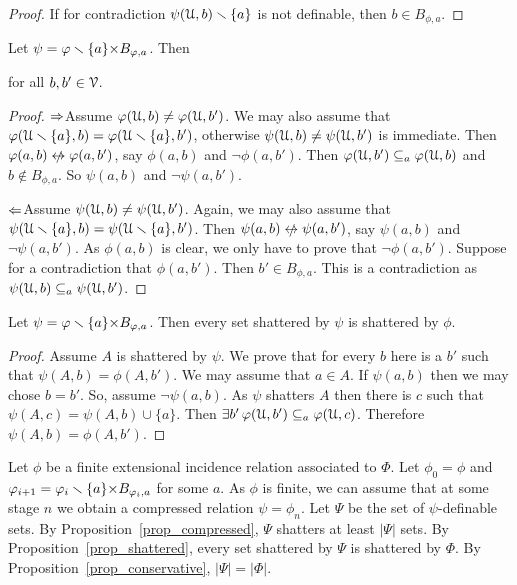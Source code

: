 \documentclass[sputnik.tex]{subfiles}
\begin{document}
\begin{proof}
If for contradiction $\psi(\EuScript U,b)\smallsetminus\{a\}$ is not definable, then $b\in B_{\phi,a}$.
\end{proof}


\begin{proposition}\label{prop_conservative} Let $\psi=\varphi\smallsetminus\{a\}{\times}B_{\varphi,a}$.
Then

\hfill for all $b,b'\in\EuScript V$.
\end{proposition}

\begin{proof}
$\Rightarrow$\quad Assume $\varphi(\EuScript U,b)\neq\varphi(\EuScript U,b')$.
We may also assume that $\varphi(\EuScript U\smallsetminus\{a\},b)=\varphi(\EuScript U\smallsetminus\{a\},b')$, otherwise $\psi(\EuScript U,b)\neq\psi(\EuScript U,b')$ is immediate.
Then $\phi(a,b)\niff\phi(a,b')$, say $ \phi(a,b)$ and $\neg \phi(a,b')$.
Then $\varphi(\EuScript U,b')\subseteq_a\varphi(\EuScript U,b)$ and $b\notin B_{\phi,a}$.
So $\psi(a,b)$ and $\neg \psi(a,b')$.

$\Leftarrow$\quad Assume $\psi(\EuScript U,b)\neq\psi(\EuScript U,b')$. 
Again, we may also assume that $\psi(\EuScript U\smallsetminus\{a\},b)=\psi(\EuScript U\smallsetminus\{a\},b')$.
Then $\psi(a,b)\niff\psi(a,b')$, say $\psi(a,b)$ and $\neg\psi(a,b')$.
As $\phi(a,b)$ is clear, we only have to prove that $\neg\phi(a,b')$.
Suppose for a contradiction that $\phi(a,b')$.
Then $b'\in B_{\phi,a}$.
This is a contradiction as $\psi(\EuScript U,b)\subseteq_a\psi(\EuScript U,b')$.
\end{proof}


\begin{proposition}\label{prop_shattered} 
Let $\psi=\varphi\smallsetminus\{a\}{\times}B_{\varphi,a}$.
Then every set shattered by $\psi$ is shattered by $\phi$.
\end{proposition}

\begin{proof}
Assume $A$ is shattered by $\psi$.
We prove that for every $b$ here is a $b'$ such that $\psi(A,b)=\phi(A,b')$.
We may assume that $a\in A$.
If $\psi(a,b)$ then we may chose $b=b'$.
So, assume $\neg\psi(a,b)$.
As $\psi$ shatters $A$ then there is $c$ such that $\psi(A,c)=\psi(A,b)\cup\{a\}$.
Then $\exists b'\,\varphi(\EuScript U,b')\subseteq_a\varphi(\EuScript U,c)$.
Therefore $\psi(A,b)=\phi(A,b')$.
\end{proof}


\begin{void_thm}\label{proof2_Pajor}\rm
Let $\phi$ be a finite extensional incidence relation associated to $\Phi$.
Let $\phi_0=\phi$ and $\varphi_{i+1}=\varphi_i\smallsetminus \{a\}{\times}B_{\varphi_i,a}$ for some $a$.
As $\phi$ is finite, we can assume that at some stage $n$ we obtain a compressed relation $\psi=\phi_n$.
Let $\Psi$ be the set of $\psi$-definable sets.
By Proposition~\ref{prop_compressed}, $\Psi$ shatters at least $|\Psi|$ sets.
By Proposition~\ref{prop_shattered}, every set shattered by $\Psi$ is shattered by $\Phi$.
By Proposition~\ref{prop_conservative}, $|\Psi|=|\Phi|$.\QED
\end{void_thm}
\end{document}
